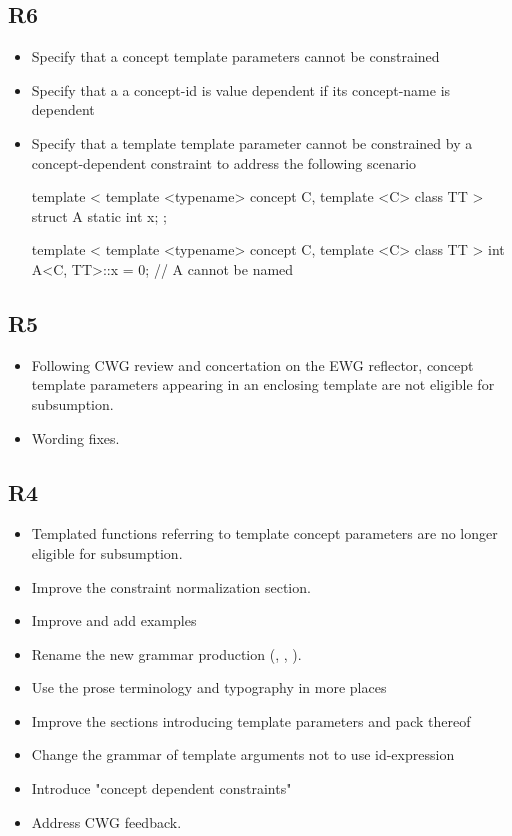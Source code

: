\documentclass{wg21}
\begin{document}
\subsection{R6}
\begin{itemize}
\item Specify that a concept template parameters cannot be constrained
\item Specify that a a concept-id is value dependent if its concept-name is dependent
\item Specify that a template template parameter cannot be constrained by a concept-dependent constraint to address the following scenario
\begin{colorblock}
template <
    template <typename> concept C,
    template <C> class TT
>
struct A {
    static int x;
};

template <
    template <typename> concept C,
    template <C> class TT
>
int A<C, TT>::x = 0; // A cannot be named
\end{colorblock}
\end{itemize}

\subsection{R5}

\begin{itemize}
\item Following CWG review and concertation on the EWG reflector,
concept template parameters appearing in an enclosing template are not eligible for subsumption.
\item Wording fixes.
\end{itemize}

\subsection{R4}

\begin{itemize}

\item Templated functions referring to template concept parameters are no
longer eligible for subsumption.
\item Improve the constraint normalization section.
\item Improve and add examples
\item Rename the new grammar production (,
, ).
\item Use the prose terminology and typography in more places
\item Improve the sections introducing template parameters and pack thereof
\item Change the grammar of template arguments not to use id-expression
\item Introduce "concept dependent constraints"
\item Address CWG feedback.
\end{itemize}
\end{document}
